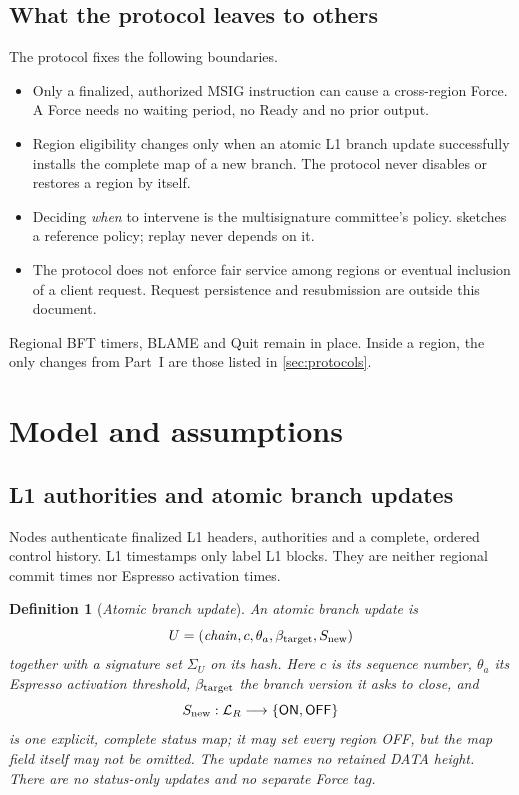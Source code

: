 \documentclass[11pt,a4paper]{article}
\newcommand{\tagg}[1]{\ensuremath{\mathsf{#1}}}
\newcommand{\defterm}[1]{\textcolor{rrBlue}{\textit{#1}}}
\newtheorem{definition}{Definition}[section]
\newcounter{protocol}
\begin{document}
\subsection{What the protocol leaves to others}
\label{sec:scope}
The protocol fixes the following boundaries.
\begin{itemize}
\item Only a finalized, authorized MSIG instruction can cause a
cross-region Force. A Force needs no waiting period, no Ready and no
prior output.
\item Region eligibility changes only when an atomic L1 branch update
successfully installs the complete map of a new branch. The protocol
never disables or restores a region by itself.
\item Deciding \emph{when} to intervene is the multisignature
committee's policy.  sketches a reference policy;
replay never depends on it.
\item The protocol does not enforce fair service among regions or
eventual inclusion of a client request. Request persistence and
resubmission are outside this document.
\end{itemize}
Regional BFT timers, BLAME and Quit remain in place. Inside a region,
the only changes from Part~I are those listed in \cref{sec:protocols}.

\section{Model and assumptions}
\label{sec:model}
\subsection{L1 authorities and atomic branch updates}
\label{sec:l1}
\label{sec:runtime-controls}
Nodes authenticate finalized L1 headers, authorities and a complete,
ordered control history. L1 timestamps only label L1 blocks. They are
neither regional commit times nor Espresso activation times.

\begin{definition}[\defterm{Atomic branch update}]
\label{def:control-update}
An atomic branch update is
\[
 U=(\mathit{chain},c,\theta_a,\beta_{\rm target},S_{\rm new})
\]
together with a signature set $\Sigma_U$ on its hash. Here $c$ is its
sequence number, $\theta_a$ its Espresso activation threshold,
$\beta_{\rm target}$ the branch version it asks to close, and
\[
 S_{\rm new}:\mathcal L_R\longrightarrow
 \{\tagg{ON},\tagg{OFF}\}
\]
is one explicit, complete status map; it may set every region OFF, but
the map field itself may not be omitted. The update names no retained
DATA height. There are no status-only updates and no separate Force tag.
\end{definition}
\end{document}
